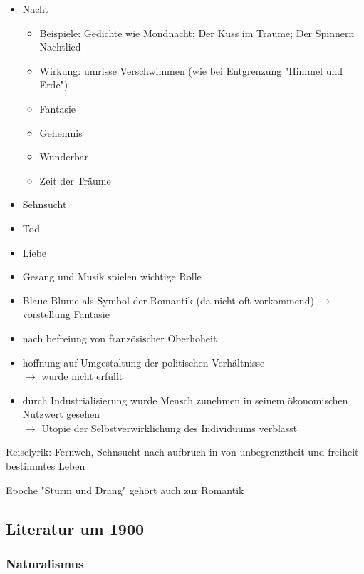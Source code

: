 \begin{itemize}
    \item Nacht 
        \begin{itemize}
            \item Beispiele: Gedichte wie Mondnacht; Der Kuss im Traume; Der Spinnern Nachtlied
            \item Wirkung: umrisse Verschwimmen (wie bei Entgrenzung "Himmel und Erde")
            \item Fantasie
            \item Gehemnis
            \item Wunderbar
            \item Zeit der Träume
        \end{itemize}
    \item Sehnsucht
    \item Tod
    \item Liebe
    \item Gesang und Musik spielen wichtige Rolle
    \item Blaue Blume als Symbol der Romantik (da nicht oft vorkommend) $\rightarrow$ vorstellung Fantasie
\end{itemize}

\begin{itemize}
    \item nach befreiung von französischer Oberhoheit
    \item hoffnung auf Umgestaltung der politischen Verhältnisse \\
        $\rightarrow$ wurde nicht erfüllt
    \item durch Industrialisierung wurde Mensch zunehmen in seinem ökonomischen Nutzwert gesehen \\
        $\rightarrow$ Utopie der Selbstverwirklichung des Individuums verblasst
\end{itemize}

Reiselyrik: Fernweh, Sehnsucht nach aufbruch in von unbegrenztheit und freiheit bestimmtes Leben

Epoche "Sturm und Drang" gehört auch zur Romantik


\subsection{Literatur um 1900}

\subsubsection{Naturalismus}

